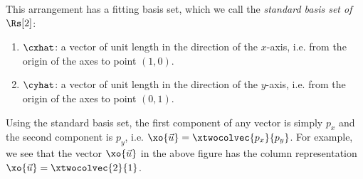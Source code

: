 This arrangement has a fitting basis set, which we call the \emph{standard basis set of $\Rs[2]$}:
\begin{enumerate}
  \item $\cxhat$: a vector of unit length in the direction of the $x$-axis, i.e. from the origin of the axes to point $(1,0)$.
  \item $\cyhat$: a vector of unit length in the direction of the $y$-axis, i.e. from the origin of the axes to point $(0,1)$.
\end{enumerate}

\begin{center}
\end{center}

Using the standard basis set, the first component of any vector is simply $p_{x}$ and the second component is $p_{y}$, i.e. $\xo{\vec{u}}=\xtwocolvec{p_{x}}{p_{y}}$. For example, we see that the vector $\xo{\vec{u}}$ in the above figure has the column representation $\xo{\vec{u}}=\xtwocolvec{2}{1}$.

